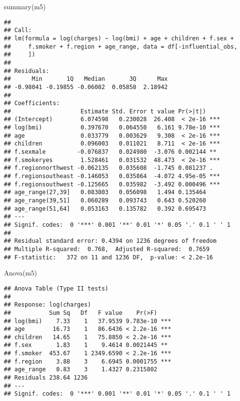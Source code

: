 \documentclass[
]{article}
\newenvironment{Shaded}{\begin{snugshade}}{\end{snugshade}}
\newcommand{\FunctionTok}[1]{\textcolor[rgb]{0.00,0.00,0.00}{#1}}
\newcommand{\NormalTok}[1]{#1}
\begin{document}
\begin{Shaded}
\begin{Highlighting}[]
\FunctionTok{summary}\NormalTok{(m5)}
\end{Highlighting}
\end{Shaded}

\begin{verbatim}
## 
## Call:
## lm(formula = log(charges) ~ log(bmi) + age + children + f.sex + 
##     f.smoker + f.region + age_range, data = df[-influential_obs, 
##     ])
## 
## Residuals:
##      Min       1Q   Median       3Q      Max 
## -0.98041 -0.19855 -0.06082  0.05858  2.18942 
## 
## Coefficients:
##                    Estimate Std. Error t value Pr(>|t|)    
## (Intercept)        6.074598   0.230028  26.408  < 2e-16 ***
## log(bmi)           0.397670   0.064550   6.161 9.78e-10 ***
## age                0.033779   0.003629   9.308  < 2e-16 ***
## children           0.096003   0.011021   8.711  < 2e-16 ***
## f.sexmale         -0.076837   0.024980  -3.076 0.002144 ** 
## f.smokeryes        1.528461   0.031532  48.473  < 2e-16 ***
## f.regionnorthwest -0.062135   0.035608  -1.745 0.081237 .  
## f.regionsoutheast -0.146053   0.035864  -4.072 4.95e-05 ***
## f.regionsouthwest -0.125665   0.035982  -3.492 0.000496 ***
## age_range(27,39]   0.083803   0.056098   1.494 0.135464    
## age_range(39,51]   0.060289   0.093743   0.643 0.520260    
## age_range(51,64]   0.053163   0.135782   0.392 0.695473    
## ---
## Signif. codes:  0 '***' 0.001 '**' 0.01 '*' 0.05 '.' 0.1 ' ' 1
## 
## Residual standard error: 0.4394 on 1236 degrees of freedom
## Multiple R-squared:  0.768,  Adjusted R-squared:  0.7659 
## F-statistic:   372 on 11 and 1236 DF,  p-value: < 2.2e-16
\end{verbatim}

\begin{Shaded}
\begin{Highlighting}[]
\FunctionTok{Anova}\NormalTok{(m5)}
\end{Highlighting}
\end{Shaded}

\begin{verbatim}
## Anova Table (Type II tests)
## 
## Response: log(charges)
##           Sum Sq   Df   F value    Pr(>F)    
## log(bmi)    7.33    1   37.9539 9.783e-10 ***
## age        16.73    1   86.6436 < 2.2e-16 ***
## children   14.65    1   75.8850 < 2.2e-16 ***
## f.sex       1.83    1    9.4614 0.0021445 ** 
## f.smoker  453.67    1 2349.6590 < 2.2e-16 ***
## f.region    3.88    3    6.6945 0.0001755 ***
## age_range   0.83    3    1.4327 0.2315802    
## Residuals 238.64 1236                        
## ---
## Signif. codes:  0 '***' 0.001 '**' 0.01 '*' 0.05 '.' 0.1 ' ' 1
\end{verbatim}
\end{document}

